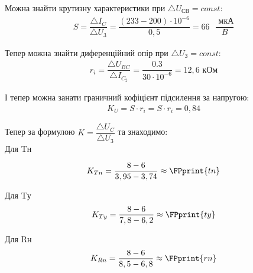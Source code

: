 \documentclass[a4paper,14pt]{extreport}
\begin{document}
\newpage

\FPeval{}

Можна знайти  крутизну характеристики при $\triangle U_{\text{СВ}} = const$:
\begin{align*}
  S = \dfrac{\triangle I_C}{\triangle U_{\text{3}}} =  \dfrac{(233-200)\cdot10^{-6}}{0,5} =  66 \text{ } \dfrac{\text{ мкА}}{B}
\end{align*}

Тепер можна знайти диференційний опір при $\triangle U_{\text{З}} = const$:
\FPeval{}
\begin{align*}
  r_i = \dfrac{\triangle U_{BC}}{\triangle I_{C_2}} = \dfrac{0.3}{30\cdot 10^{-6}} = 12,6\text{ кОм}
\end{align*}

І тепер можна занати граничний кофіцієнт підсилення за напругою:
\FPeval{}
\begin{align*}
 K_U = S\cdot r_i = S\cdot r_i = 0,84
\end{align*}











Тепер за формулою $K = \dfrac{\triangle U_C}{\triangle U_3}$ та знаходимо:\\

Для Tн
\FPeval{}

\FPeval{}
\begin{align*}
  K_{Tn} = \dfrac{8-6}{3,95-3,74} \approx \FPprint{tn}
\end{align*}

Для Tу
\FPeval{}
\begin{align*}
  K_{Ty} = \dfrac{8-6}{7,8-6,2} \approx \FPprint{ty}
\end{align*}

Для Rн
\FPeval{}
\begin{align*}
  K_{Rn} = \dfrac{8-6}{8,5-6,8} \approx \FPprint{rn}
\end{align*}
\end{document}
